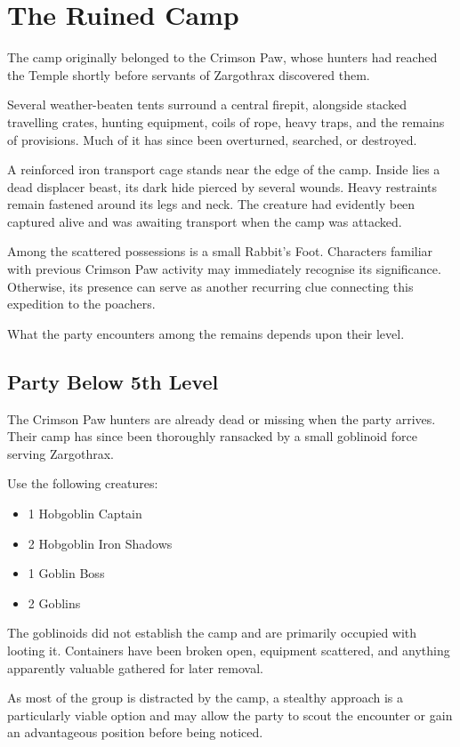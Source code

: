 \section*{The Ruined Camp}
{\entryfont The camp originally belonged to the Crimson Paw, whose hunters had reached the Temple shortly before servants of Zargothrax discovered them.

Several weather-beaten tents surround a central firepit, alongside stacked travelling crates, hunting equipment, coils of rope, heavy traps, and the remains of provisions. Much of it has since been overturned, searched, or destroyed.

A reinforced iron transport cage stands near the edge of the camp. Inside lies a dead displacer beast, its dark hide pierced by several wounds. Heavy restraints remain fastened around its legs and neck. The creature had evidently been captured alive and was awaiting transport when the camp was attacked.

Among the scattered possessions is a small Rabbit's Foot. Characters familiar with previous Crimson Paw activity may immediately recognise its significance. Otherwise, its presence can serve as another recurring clue connecting this expedition to the poachers.

What the party encounters among the remains depends upon their level.}

\subsection*{Party Below 5th Level}
{\entryfont The Crimson Paw hunters are already dead or missing when the party arrives. Their camp has since been thoroughly ransacked by a small goblinoid force serving Zargothrax.

Use the following creatures:
\begin{itemize}
	\item 1 Hobgoblin Captain
	\item 2 Hobgoblin Iron Shadows
	\item 1 Goblin Boss
	\item 2 Goblins
\end{itemize}
The goblinoids did not establish the camp and are primarily occupied with looting it. Containers have been broken open, equipment scattered, and anything apparently valuable gathered for later removal.

As most of the group is distracted by the camp, a stealthy approach is a particularly viable option and may allow the party to scout the encounter or gain an advantageous position before being noticed.}

